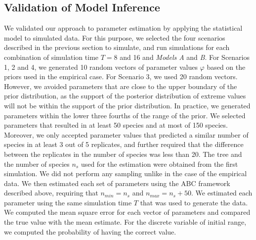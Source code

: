 \subsection*{Validation of Model Inference}
\noindent We validated our approach to parameter estimation by applying the statistical model to simulated data.
For this purpose, we selected the four scenarios described in the previous section to simulate, and run simulations for each combination of simulation time $T = 8$ and 16 and \textit{Models A} and \textit{B}. 
For Scenarios 1, 2 and 4, we generated 10 random vectors of parameter values $\varphi$ based on the priors used in the empirical case. 
For Scenario 3, we used 20 random vectors.  
However, we avoided parameters that are close to the upper boundary of the prior distribution, as the support of the posterior distribution of extreme values will not be within the support of the prior distribution. 
In practice, we generated parameters within the lower three fourths of the range of the prior. 
We selected parameters that resulted in at least 50 species and at most of 150 species. 
Moreover, we only accepted parameter values that predicted a similar number of species in at least 3 out of 5 replicates, and further required that the difference between the replicates in the number of species was less than 20. 
The tree and the number of species $n_s$  used for the estimation were obtained from the first simulation. 
We did not perform any sampling unlike in the case of the empirical data. 
We then estimated each set of parameters using the ABC framework described above, requiring that $n_{min}=n_s$  and $n_{max}=n_s+50$. 
We estimated each parameter using the same simulation time $T$ that was used to generate the data. 
We computed the mean square error for each vector of parameters and compared the true value with the mean estimate. 
For the discrete variable of initial range, we computed the probability of having the correct value. 


